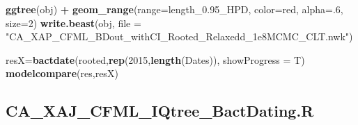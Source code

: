 \documentclass[
]{book}
\newenvironment{Shaded}{\begin{snugshade}}{\end{snugshade}}
\newcommand{\AttributeTok}[1]{\textcolor[rgb]{0.13,0.29,0.53}{#1}}
\newcommand{\DecValTok}[1]{\textcolor[rgb]{0.00,0.00,0.81}{#1}}
\newcommand{\FunctionTok}[1]{\textcolor[rgb]{0.13,0.29,0.53}{\textbf{#1}}}
\newcommand{\NormalTok}[1]{#1}
\newcommand{\OtherTok}[1]{\textcolor[rgb]{0.56,0.35,0.01}{#1}}
\newcommand{\SpecialCharTok}[1]{\textcolor[rgb]{0.81,0.36,0.00}{\textbf{#1}}}
\newcommand{\StringTok}[1]{\textcolor[rgb]{0.31,0.60,0.02}{#1}}
\begin{document}
\begin{Shaded}
\begin{Highlighting}[]
\FunctionTok{ggtree}\NormalTok{(obj) }\SpecialCharTok{+} \FunctionTok{geom\_range}\NormalTok{(}\AttributeTok{range=}\StringTok{\textquotesingle{}length\_0.95\_HPD\textquotesingle{}}\NormalTok{, }\AttributeTok{color=}\StringTok{\textquotesingle{}red\textquotesingle{}}\NormalTok{, }\AttributeTok{alpha=}\NormalTok{.}\DecValTok{6}\NormalTok{, }\AttributeTok{size=}\DecValTok{2}\NormalTok{)}
\FunctionTok{write.beast}\NormalTok{(obj, }\AttributeTok{file =} \StringTok{"CA\_XAP\_CFML\_BDout\_withCI\_Rooted\_Relaxedd\_1e8MCMC\_CLT.nwk"}\NormalTok{)}

\NormalTok{resX}\OtherTok{=}\FunctionTok{bactdate}\NormalTok{(rooted,}\FunctionTok{rep}\NormalTok{(}\DecValTok{2015}\NormalTok{,}\FunctionTok{length}\NormalTok{(Dates)),  }\AttributeTok{showProgress =}\NormalTok{ T)}
\FunctionTok{modelcompare}\NormalTok{(res,resX)}
\end{Highlighting}
\end{Shaded}

\subsection{CA\_XAJ\_CFML\_IQtree\_BactDating.R}\label{BDIQCFML-script}
\end{document}

